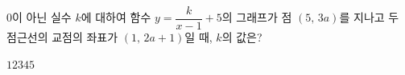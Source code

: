 \hspace*{2mm}\begin{minipage}[t]{\dimexpr\linewidth-2mm\relax}\vspace{0pt}
$0$이 아닌 실수 $k$에 대하여 함수 $y=\dfrac{k}{x-1}+5$의 그래프가 점 $(5,\,3a)$를 지나고 두 점근선의 교점의 좌표가 $(1,\,2a+1)$일 때, $k$의 값은?
\begin{choices32}{$1$}{$2$}{$3$}{$4$}{$5$}\end{choices32}\end{minipage}
